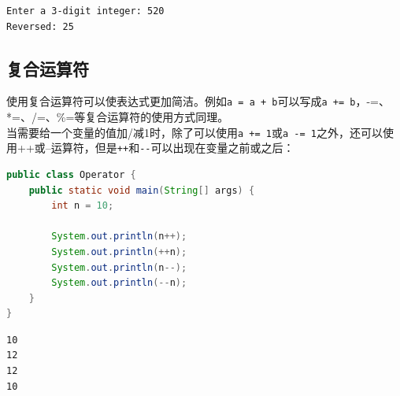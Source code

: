 \begin{tcolorbox}
	\begin{verbatim}
Enter a 3-digit integer: 520
Reversed: 25
	\end{verbatim}
\end{tcolorbox}

\vspace{0.5cm}

\subsection{复合运算符}

使用复合运算符可以使表达式更加简洁。例如\lstinline|a = a + b|可以写成\lstinline|a += b|，-=、*=、/=、\%=等复合运算符的使用方式同理。\\

当需要给一个变量的值加/减1时，除了可以使用\lstinline|a += 1|或\lstinline|a -= 1|之外，还可以使用++或--运算符，但是\lstinline|++|和\lstinline|--|可以出现在变量之前或之后：\\

\begin{table}[H]
	\centering
	\caption{自增/自减运算符}
\end{table}


\begin{lstlisting}[language=Java]
public class Operator {
	public static void main(String[] args) {
		int n = 10;

		System.out.println(n++);
		System.out.println(++n);
		System.out.println(n--);
		System.out.println(--n);
	}
}
\end{lstlisting}

\begin{tcolorbox}
	\begin{verbatim}
10
12
12
10
	\end{verbatim}
\end{tcolorbox}

